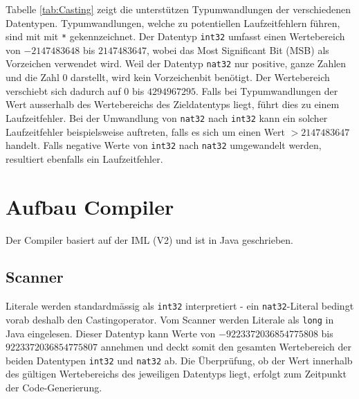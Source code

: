 \documentclass[10pt, a4paper, twocolumn]{article} %
\begin{document}
Tabelle \ref{tab:Casting} zeigt die unterstützen Typumwandlungen der verschiedenen Datentypen.
Typumwandlungen, welche zu potentiellen Laufzeitfehlern führen, sind mit mit \texttt{*} gekennzeichnet.
Der Datentyp \texttt{int32} umfasst einen Wertebereich von $-2147483648$ bis $2147483647$, wobei das Most Significant Bit (MSB) als Vorzeichen verwendet wird.
Weil der Datentyp \texttt{nat32} nur positive, ganze Zahlen und die Zahl 0 darstellt, wird kein Vorzeichenbit benötigt.
Der Wertebereich verschiebt sich dadurch auf $0$ bis $4294967295$.
Falls bei Typumwandlungen der Wert ausserhalb des Wertebereichs des Zieldatentyps liegt, führt dies zu einem Laufzeitfehler.
Bei der Umwandlung von \texttt{nat32} nach \texttt{int32} kann ein solcher Laufzeitfehler beispielsweise auftreten, falls es sich um einen Wert $> 2147483647$ handelt.
Falls negative Werte von \texttt{int32} nach \texttt{nat32} umgewandelt werden, resultiert ebenfalls ein Laufzeitfehler.
\begin{table}[h]
    \tiny
    \centering
    \caption{Casting zwischen Datentypen}
    \label{tab:Casting}
\end{table}

\section{Aufbau Compiler}
Der Compiler basiert auf der IML (V2) und ist in Java geschrieben.

\subsection{Scanner}
\label{scanner}
Literale werden standardmässig als \texttt{int32} interpretiert - ein \texttt{nat32}-Literal bedingt vorab deshalb den Castingoperator.
Vom Scanner werden Literale als \texttt{long} in Java eingelesen.
Dieser Datentyp kann Werte von $-9223372036854775808$ bis $9223372036854775807$ annehmen und deckt somit den gesamten Wertebereich der beiden Datentypen \texttt{int32} und \texttt{nat32} ab.
Die Überprüfung, ob der Wert innerhalb des gültigen Wertebereichs des jeweiligen Datentyps liegt, erfolgt zum Zeitpunkt der Code-Generierung.
\end{document}
